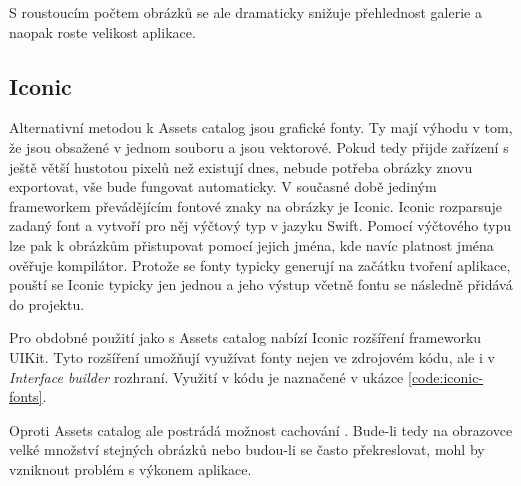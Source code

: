 S roustoucím počtem obrázků se ale dramaticky snižuje přehlednost galerie a naopak roste velikost aplikace.

\subsection{Iconic}

Alternativní metodou k Assets catalog jsou grafické fonty.
Ty mají výhodu v tom, že jsou obsažené v jednom souboru a jsou vektorové.
Pokud tedy přijde zařízení s ještě větší hustotou pixelů než existují dnes, nebude potřeba obrázky znovu exportovat, vše bude fungovat automaticky.
V současné době jediným frameworkem převádějícím fontové znaky na obrázky je Iconic.
Iconic rozparsuje zadaný font a vytvoří pro něj výčtový typ v jazyku Swift.
Pomocí výčtového typu lze pak k obrázkům přistupovat pomocí jejich jména, kde navíc platnost jména ověřuje kompilátor.
Protože se fonty typicky generují na začátku tvoření aplikace, pouští se Iconic typicky jen jednou a jeho výstup včetně fontu se následně přidává do projektu.

Pro obdobné použití jako s Assets catalog nabízí Iconic rozšíření frameworku UIKit.
Tyto rozšíření umožňují využívat fonty nejen ve zdrojovém kódu, ale i v \textit{Interface builder} rozhraní.
Využití v kódu je naznačené v ukázce \ref{code:iconic-fonts}.


Oproti Assets catalog ale postrádá možnost cachování \cite{github-iconic-cache}.
Bude-li tedy na obrazovce velké množství stejných obrázků nebo budou-li se často překreslovat, mohl by vzniknout problém s výkonem aplikace.
